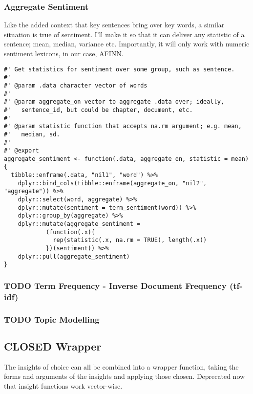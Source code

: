 \documentclass[a4paper, 11pt]{article}
\begin{document}
\subsubsection{Aggregate Sentiment}
\label{sec:org51605f9}
Like the added context that key sentences bring over key words, a
similar situation is true of sentiment. I'll make it so that it can
deliver any statistic of a sentence; mean, median, variance etc.
Importantly, it will only work with numeric sentiment lexicons, in our
case, AFINN.
\begin{verbatim}
#' Get statistics for sentiment over some group, such as sentence.
#'
#' @param .data character vector of words
#'
#' @param aggregate_on vector to aggregate .data over; ideally,
#'   sentence_id, but could be chapter, document, etc.
#'
#' @param statistic function that accepts na.rm argument; e.g. mean,
#'   median, sd.
#'
#' @export
aggregate_sentiment <- function(.data, aggregate_on, statistic = mean){
  tibble::enframe(.data, "nil1", "word") %>%
    dplyr::bind_cols(tibble::enframe(aggregate_on, "nil2", "aggregate")) %>%
    dplyr::select(word, aggregate) %>%
    dplyr::mutate(sentiment = term_sentiment(word)) %>%
    dplyr::group_by(aggregate) %>%
    dplyr::mutate(aggregate_sentiment =
		    (function(.x){
		      rep(statistic(.x, na.rm = TRUE), length(.x))
		    })(sentiment)) %>%
    dplyr::pull(aggregate_sentiment)
}
\end{verbatim}
\subsubsection{{\bfseries\sffamily TODO} Term Frequency - Inverse Document Frequency (tf-idf)}
\label{sec:org351a4dd}
\subsubsection{{\bfseries\sffamily TODO} Topic Modelling}
\label{sec:org50eacfa}
\subsection{{\bfseries\sffamily CLOSED} Wrapper}
\label{sec:org8c5c412}
The insights of choice can all be combined into a wrapper function,
taking the forms and arguments of the insights and applying those
chosen. Deprecated now that insight functions work vector-wise.
\end{document}

